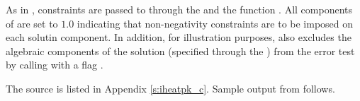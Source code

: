 As in , constraints are passed to {\ida} through
the   and the function .
All components of  are set to $1.0$ indicating that non-negativity
constraints are to be imposed on each solutin component.
In addition, for illustration purposes,  also excludes the algebraic 
components of the solution (specified through the  ) from the 
error test by calling  with a flag .

The source is listed in Appendix \ref{s:iheatpk_c}.
Sample output from  follows.

